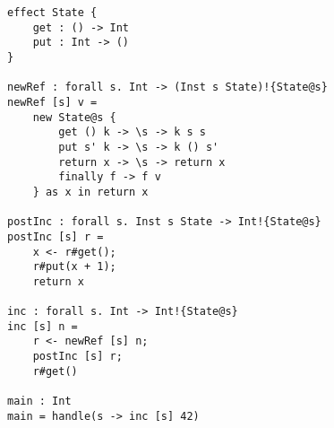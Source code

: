 \begin{verbatim}
effect State {
	get : () -> Int
	put : Int -> ()
}

newRef : forall s. Int -> (Inst s State)!{State@s}
newRef [s] v =
	new State@s {
		get () k -> \s -> k s s
		put s' k -> \s -> k () s'
		return x -> \s -> return x
		finally f -> f v
	} as x in return x

postInc : forall s. Inst s State -> Int!{State@s}
postInc [s] r =
	x <- r#get();
	r#put(x + 1);
	return x

inc : forall s. Int -> Int!{State@s}
inc [s] n =
	r <- newRef [s] n;
	postInc [s] r;
	r#get()

main : Int
main = handle(s -> inc [s] 42)
\end{verbatim}
